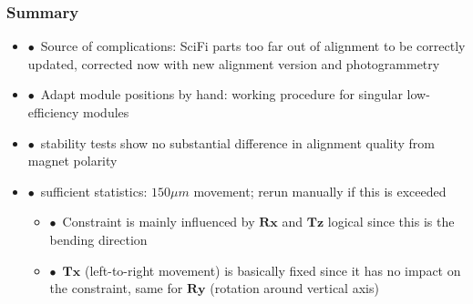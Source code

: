 \documentclass[aspectratio=1610, 12pt, xcolor=dvipsnames]{beamer}
\begin{document}
\begin{frame}\frametitle{Summary}
  \begin{itemize}
    \setlength\itemsep{0em}
    \item $\bullet$\, Source of complications: SciFi parts too far out of alignment to be correctly updated, corrected now with new alignment version and photogrammetry
    \item $\bullet$\, Adapt module positions by hand: working procedure for singular low-efficiency modules
    \item $\bullet$\, stability tests show no substantial difference in alignment quality from magnet polarity
    \item $\bullet$\, sufficient statistics: $150 \mu m$ movement; rerun manually if this is exceeded
    \begin{itemize}
      \item $\bullet$\, Constraint is mainly influenced by $\textbf{Rx}$ and $\textbf{Tz}$ \to logical since this is the bending direction
      \item $\bullet$\, $\textbf{Tx}$ (left-to-right movement) is basically fixed since it has no impact on the constraint, same for $\textbf{Ry}$ (rotation around vertical axis)
    \end{itemize}
  \end{itemize}
\end{frame}

%  
\end{document}
